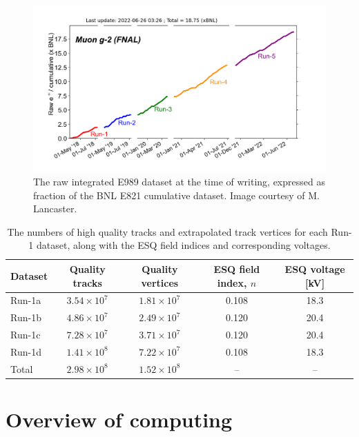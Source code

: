 \begin{figure}[t!]
\centering{}
\includegraphics[trim={0 0 0 1.5cm},clip,width=\textwidth]{Images/Chapter3/integratedctag.png}
\caption{The raw integrated E989 dataset at the time of writing, expressed as fraction of the BNL E821 cumulative dataset. Image courtesy of M. Lancaster.}
\label{fig:ctag}
\end{figure}

\begin{table}[t!]
\centering
\begin{tabular}{l|cccc}
\hline
\hline
Dataset & Quality tracks & Quality vertices & ESQ field index, $n$ & ESQ voltage [kV] \\
\hline
Run-1a & $3.54\times10^{7}$ & $1.81\times10^{7}$ & 0.108 & 18.3 \\ 
Run-1b & $4.86\times10^{7}$ & $2.49\times10^{7}$ & 0.120 & 20.4 \\
Run-1c & $7.28\times10^{7}$ & $3.71\times10^{7}$ & 0.120 & 20.4 \\
Run-1d & $1.41\times10^{8}$ & $7.22\times10^{7}$ & 0.108 & 18.3 \\
\hdashline
Total & $2.98\times10^{8}$ & $1.52\times10^{8}$ & -- & -- \\ 
\hline
\hline
\end{tabular}
\caption{The numbers of high quality tracks and extrapolated track vertices for each Run-1 dataset, along with the ESQ field indices and corresponding voltages.}
\label{tbl:MeasPeriods}
\end{table}

\section{Overview of computing}\label{sec:Computing}

